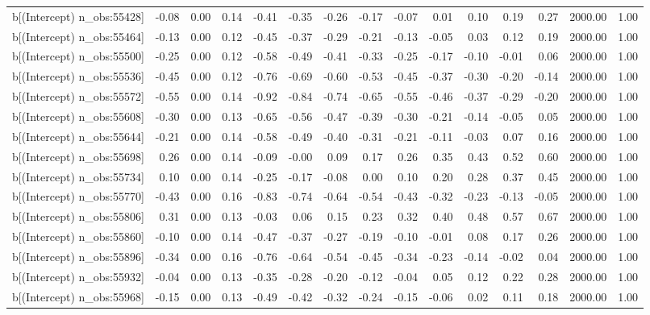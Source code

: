 \begin{table}[ht]
\begin{tabular}{rrrrrrrrrrrrrrr}
  b[(Intercept) n\_obs:55428] & -0.08 & 0.00 & 0.14 & -0.41 & -0.35 & -0.26 & -0.17 & -0.07 & 0.01 & 0.10 & 0.19 & 0.27 & 2000.00 & 1.00 \\ 
  b[(Intercept) n\_obs:55464] & -0.13 & 0.00 & 0.12 & -0.45 & -0.37 & -0.29 & -0.21 & -0.13 & -0.05 & 0.03 & 0.12 & 0.19 & 2000.00 & 1.00 \\ 
  b[(Intercept) n\_obs:55500] & -0.25 & 0.00 & 0.12 & -0.58 & -0.49 & -0.41 & -0.33 & -0.25 & -0.17 & -0.10 & -0.01 & 0.06 & 2000.00 & 1.00 \\ 
  b[(Intercept) n\_obs:55536] & -0.45 & 0.00 & 0.12 & -0.76 & -0.69 & -0.60 & -0.53 & -0.45 & -0.37 & -0.30 & -0.20 & -0.14 & 2000.00 & 1.00 \\ 
  b[(Intercept) n\_obs:55572] & -0.55 & 0.00 & 0.14 & -0.92 & -0.84 & -0.74 & -0.65 & -0.55 & -0.46 & -0.37 & -0.29 & -0.20 & 2000.00 & 1.00 \\ 
  b[(Intercept) n\_obs:55608] & -0.30 & 0.00 & 0.13 & -0.65 & -0.56 & -0.47 & -0.39 & -0.30 & -0.21 & -0.14 & -0.05 & 0.05 & 2000.00 & 1.00 \\ 
  b[(Intercept) n\_obs:55644] & -0.21 & 0.00 & 0.14 & -0.58 & -0.49 & -0.40 & -0.31 & -0.21 & -0.11 & -0.03 & 0.07 & 0.16 & 2000.00 & 1.00 \\ 
  b[(Intercept) n\_obs:55698] & 0.26 & 0.00 & 0.14 & -0.09 & -0.00 & 0.09 & 0.17 & 0.26 & 0.35 & 0.43 & 0.52 & 0.60 & 2000.00 & 1.00 \\ 
  b[(Intercept) n\_obs:55734] & 0.10 & 0.00 & 0.14 & -0.25 & -0.17 & -0.08 & 0.00 & 0.10 & 0.20 & 0.28 & 0.37 & 0.45 & 2000.00 & 1.00 \\ 
  b[(Intercept) n\_obs:55770] & -0.43 & 0.00 & 0.16 & -0.83 & -0.74 & -0.64 & -0.54 & -0.43 & -0.32 & -0.23 & -0.13 & -0.05 & 2000.00 & 1.00 \\ 
  b[(Intercept) n\_obs:55806] & 0.31 & 0.00 & 0.13 & -0.03 & 0.06 & 0.15 & 0.23 & 0.32 & 0.40 & 0.48 & 0.57 & 0.67 & 2000.00 & 1.00 \\ 
  b[(Intercept) n\_obs:55860] & -0.10 & 0.00 & 0.14 & -0.47 & -0.37 & -0.27 & -0.19 & -0.10 & -0.01 & 0.08 & 0.17 & 0.26 & 2000.00 & 1.00 \\ 
  b[(Intercept) n\_obs:55896] & -0.34 & 0.00 & 0.16 & -0.76 & -0.64 & -0.54 & -0.45 & -0.34 & -0.23 & -0.14 & -0.02 & 0.04 & 2000.00 & 1.00 \\ 
  b[(Intercept) n\_obs:55932] & -0.04 & 0.00 & 0.13 & -0.35 & -0.28 & -0.20 & -0.12 & -0.04 & 0.05 & 0.12 & 0.22 & 0.28 & 2000.00 & 1.00 \\ 
  b[(Intercept) n\_obs:55968] & -0.15 & 0.00 & 0.13 & -0.49 & -0.42 & -0.32 & -0.24 & -0.15 & -0.06 & 0.02 & 0.11 & 0.18 & 2000.00 & 1.00 \\ 

\end{tabular}
\end{table}
